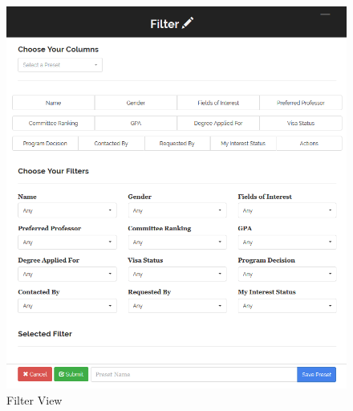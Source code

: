 \documentclass[fontsize=12pt,paper=letter,twoside]{scrartcl}
\begin{document}
\begin{figure}[!htb]
\begin{center}
\includegraphics[width=.99\textwidth]{images/filter_view.png}
\end{center}
\caption{Filter View}
\label{fig:filter_view}
\end{figure}
\end{document}
